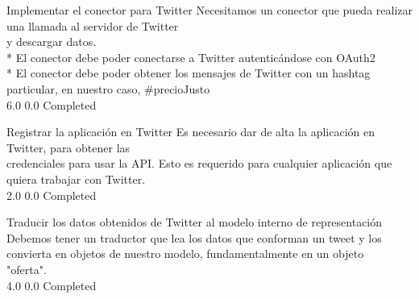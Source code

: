 		{Implementar el conector para Twitter} %
		{Necesitamos un conector que pueda realizar una llamada al servidor de Twitter\\
y descargar datos.\\
* El conector debe poder conectarse a Twitter autenticándose con OAuth2\\
* El conector debe poder obtener los mensajes de Twitter con un hashtag particular, en nuestro caso, #precioJusto\\
} %
		{6.0} %
		{} %
		{0.0} %
		{Completed} %

		{Registrar la aplicación en Twitter} %
		{Es necesario dar de alta la aplicación en Twitter, para obtener las\\
credenciales para usar la API. Esto es requerido para cualquier aplicación que\\
quiera trabajar con Twitter.\\
} %
		{2.0} %
		{} %
		{0.0} %
		{Completed} %

		{Traducir los datos obtenidos de Twitter al modelo interno de representación} %
		{Debemos tener un traductor que lea los datos que conforman un tweet y los\\
convierta en objetos de nuestro modelo, fundamentalmente en un objeto\\
"oferta".\\
} %
		{4.0} %
		{} %
		{0.0} %
		{Completed} %


\vspace{20pt}

